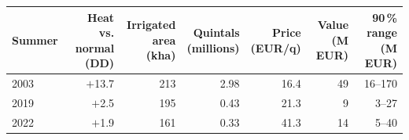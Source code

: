 \begin{tabular}{lrrrrrr}
\toprule
Summer & \shortstack{Heat vs.\\normal (DD)} & \shortstack{Irrigated\\area (kha)} & \shortstack{Quintals\\(millions)} & \shortstack{Price\\(EUR/q)} & \shortstack{Value\\(M EUR)} & \shortstack{90\,\% range\\(M EUR)} \\
\midrule
2003 & $+$13.7 & 213 & 2.98 & 16.4 & 49 & 16--170 \\
2019 & $+$2.5 & 195 & 0.43 & 21.3 & 9 & 3--27 \\
2022 & $+$1.9 & 161 & 0.33 & 41.3 & 14 & 5--40 \\
\bottomrule
\end{tabular}

